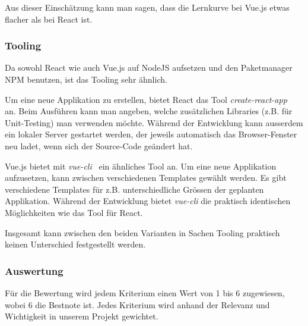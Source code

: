 Aus dieser Einschätzung kann man sagen, dass die Lernkurve bei Vue.js etwas flacher als bei React ist.

\subsubsection{Tooling}
\label{Analyse Framework:Tooling}

Da sowohl React wie auch Vue.js auf NodeJS aufsetzen und den Paketmanager NPM benutzen, ist das Tooling sehr ähnlich.

Um eine neue Applikation zu erstellen, bietet React das Tool \emph{create-react-app}~\cite{create_react_app} an.
Beim Ausführen kann man angeben, welche zusätzlichen Libraries (z.B. für Unit-Testing) man verwenden möchte.
Während der Entwicklung kann ausserdem ein lokaler Server gestartet werden, der jeweils automatisch das Browser-Fenster neu ladet, wenn sich der Source-Code geändert hat.

Vue.js bietet mit \emph{vue-cli}~\cite{vue_cli} ein ähnliches Tool an.
Um eine neue Applikation aufzusetzen, kann zwischen verschiedenen Templates gewählt werden.
Es gibt verschiedene Templates für z.B. unterschiedliche Grössen der geplanten Applikation.
Während der Entwicklung bietet \emph{vue-cli} die praktisch identischen Möglichkeiten wie das Tool für React.

Insgesamt kann zwischen den beiden Varianten in Sachen Tooling praktisch keinen Unterschied festgestellt werden.


\subsubsection{Auswertung}
\label{Analyse Framework:Auswertung}

Für die Bewertung wird jedem Kriterium einen Wert von 1 bis 6 zugewiesen, wobei 6 die Bestnote ist.
Jedes Kriterium wird anhand der Relevanz und Wichtigkeit in unserem Projekt gewichtet.

